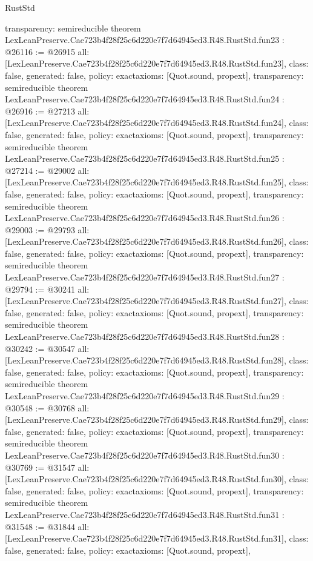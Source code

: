 \begin{lexlean}{RustStd}
\begin{coremodule}
{  transparency: semireducible
}
theorem LexLeanPreserve.Cae723b4f28f25c6d220e7f7d64945ed3.R48.RustStd.fun23 : @26116 := @26915 {
  all: [LexLeanPreserve.Cae723b4f28f25c6d220e7f7d64945ed3.R48.RustStd.fun23],
  class: false,
  generated: false,
  policy: exact{axioms: [Quot.sound, propext]},
  transparency: semireducible
}
theorem LexLeanPreserve.Cae723b4f28f25c6d220e7f7d64945ed3.R48.RustStd.fun24 : @26916 := @27213 {
  all: [LexLeanPreserve.Cae723b4f28f25c6d220e7f7d64945ed3.R48.RustStd.fun24],
  class: false,
  generated: false,
  policy: exact{axioms: [Quot.sound, propext]},
  transparency: semireducible
}
theorem LexLeanPreserve.Cae723b4f28f25c6d220e7f7d64945ed3.R48.RustStd.fun25 : @27214 := @29002 {
  all: [LexLeanPreserve.Cae723b4f28f25c6d220e7f7d64945ed3.R48.RustStd.fun25],
  class: false,
  generated: false,
  policy: exact{axioms: [Quot.sound, propext]},
  transparency: semireducible
}
theorem LexLeanPreserve.Cae723b4f28f25c6d220e7f7d64945ed3.R48.RustStd.fun26 : @29003 := @29793 {
  all: [LexLeanPreserve.Cae723b4f28f25c6d220e7f7d64945ed3.R48.RustStd.fun26],
  class: false,
  generated: false,
  policy: exact{axioms: [Quot.sound, propext]},
  transparency: semireducible
}
theorem LexLeanPreserve.Cae723b4f28f25c6d220e7f7d64945ed3.R48.RustStd.fun27 : @29794 := @30241 {
  all: [LexLeanPreserve.Cae723b4f28f25c6d220e7f7d64945ed3.R48.RustStd.fun27],
  class: false,
  generated: false,
  policy: exact{axioms: [Quot.sound, propext]},
  transparency: semireducible
}
theorem LexLeanPreserve.Cae723b4f28f25c6d220e7f7d64945ed3.R48.RustStd.fun28 : @30242 := @30547 {
  all: [LexLeanPreserve.Cae723b4f28f25c6d220e7f7d64945ed3.R48.RustStd.fun28],
  class: false,
  generated: false,
  policy: exact{axioms: [Quot.sound, propext]},
  transparency: semireducible
}
theorem LexLeanPreserve.Cae723b4f28f25c6d220e7f7d64945ed3.R48.RustStd.fun29 : @30548 := @30768 {
  all: [LexLeanPreserve.Cae723b4f28f25c6d220e7f7d64945ed3.R48.RustStd.fun29],
  class: false,
  generated: false,
  policy: exact{axioms: [Quot.sound, propext]},
  transparency: semireducible
}
theorem LexLeanPreserve.Cae723b4f28f25c6d220e7f7d64945ed3.R48.RustStd.fun30 : @30769 := @31547 {
  all: [LexLeanPreserve.Cae723b4f28f25c6d220e7f7d64945ed3.R48.RustStd.fun30],
  class: false,
  generated: false,
  policy: exact{axioms: [Quot.sound, propext]},
  transparency: semireducible
}
theorem LexLeanPreserve.Cae723b4f28f25c6d220e7f7d64945ed3.R48.RustStd.fun31 : @31548 := @31844 {
  all: [LexLeanPreserve.Cae723b4f28f25c6d220e7f7d64945ed3.R48.RustStd.fun31],
  class: false,
  generated: false,
  policy: exact{axioms: [Quot.sound, propext]},
}
\end{coremodule}
\end{lexlean}
